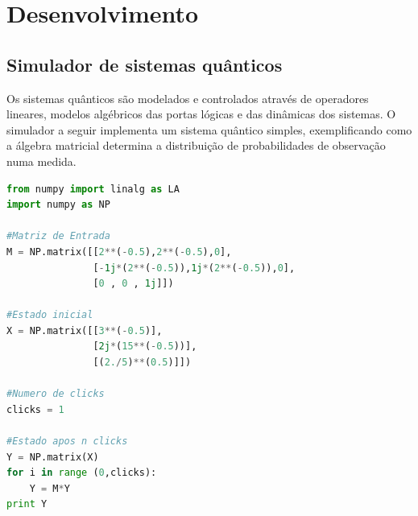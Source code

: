\documentclass[inci,lof,loc]{imetex}
\begin{document}
\chapter{Desenvolvimento}
\section{Simulador de sistemas quânticos}
Os sistemas quânticos são modelados e controlados através de operadores lineares, modelos algébricos das portas lógicas e das dinâmicas dos sistemas. O simulador a seguir implementa um sistema quântico simples, exemplificando como a álgebra matricial determina a distribuição de probabilidades de observação numa medida.
\begin{lstlisting}[language=Python, caption={Simulador quântico básico}, label=simuladorqb]
from numpy import linalg as LA
import numpy as NP

#Matriz de Entrada
M = NP.matrix([[2**(-0.5),2**(-0.5),0],
               [-1j*(2**(-0.5)),1j*(2**(-0.5)),0],
               [0 , 0 , 1j]])

#Estado inicial
X = NP.matrix([[3**(-0.5)],
               [2j*(15**(-0.5))],
               [(2./5)**(0.5)]])

#Numero de clicks
clicks = 1

#Estado apos n clicks
Y = NP.matrix(X)
for i in range (0,clicks):
    Y = M*Y
print Y
\end{lstlisting}
\end{document}
